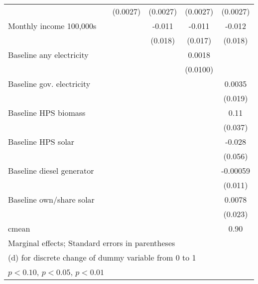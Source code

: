 \begin{table}[htbp]
\begin{tabular*}{1\hsize}{@{\hskip\tabcolsep\extracolsep\fill}l*{5}{c}}
                &                  & (0.0027)         & (0.0027)         & (0.0027)         & (0.0027)         \\
Monthly income 100,000s&                  &                  &   -0.011         &   -0.011         &   -0.012         \\
                &                  &                  &  (0.018)         &  (0.017)         &  (0.018)         \\
Baseline any electricity&                  &                  &                  &   0.0018         &                  \\
                &                  &                  &                  & (0.0100)         &                  \\
Baseline gov. electricity&                  &                  &                  &                  &   0.0035         \\
                &                  &                  &                  &                  &  (0.019)         \\
Baseline HPS biomass&                  &                  &                  &                  &     0.11\sym{***}\\
                &                  &                  &                  &                  &  (0.037)         \\
Baseline HPS solar&                  &                  &                  &                  &   -0.028         \\
                &                  &                  &                  &                  &  (0.056)         \\
Baseline diesel generator&                  &                  &                  &                  & -0.00059         \\
                &                  &                  &                  &                  &  (0.011)         \\
Baseline own/share solar&                  &                  &                  &                  &   0.0078         \\
                &                  &                  &                  &                  &  (0.023)         \\
\midrule
cmean           &                  &                  &                  &                  &     0.90         \\
\bottomrule
\multicolumn{6}{l}{\footnotesize Marginal effects; Standard errors in parentheses}\\
\multicolumn{6}{l}{\footnotesize  (d) for discrete change of dummy variable from 0 to 1}\\
\multicolumn{6}{l}{\footnotesize \sym{*} \(p<0.10\), \sym{**} \(p<0.05\), \sym{***} \(p<0.01\)}\\
\end{tabular*}
\end{table}

